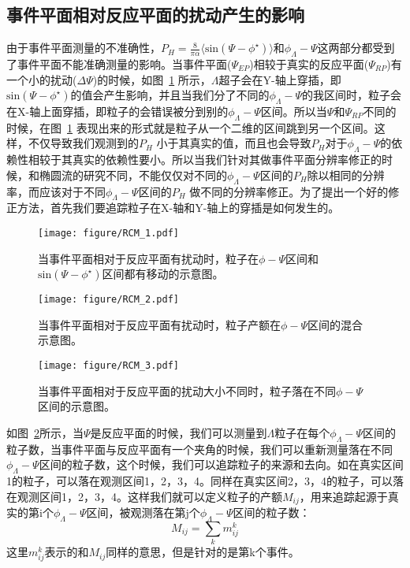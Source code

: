 \subsection{事件平面相对反应平面的扰动产生的影响}
由于事件平面测量的不准确性，$P_{H} = \frac{8}{\pi\alpha} \langle \mathrm{sin}(\Psi-\phi^{\star}) \rangle $和$\phi_{\Lambda}-\Psi$这两部分都受到了事件平面不能准确测量的影响。当事件平面($\Psi_{EP}$)相较于真实的反应平面($\Psi_{RP}$)有一个小的扰动($\Delta\Psi$)的时候，如图~\ref{fig:RCM_1} 所示，$\Lambda$超子会在Y-轴上穿插，即$\mathrm{sin}(\Psi-\phi^{\star})$的值会产生影响，并且当我们分了不同的$\phi_{\Lambda}-\Psi$的我区间时，粒子会在X-轴上面穿插，即粒子的会错误被分到别的$\phi_{\Lambda}-\Psi$区间。所以当$\Psi$和$\Psi_{RP}$不同的时候，在图~\ref{fig:RCM_1} 表现出来的形式就是粒子从一个二维的区间跳到另一个区间。这样，不仅导致我们观测到的$P_{H}$ 小于其真实的值，而且也会导致$P_{H}$对于$\phi_{\Lambda}-\Psi$的依赖性相较于其真实的依赖性要小。所以当我们针对其做事件平面分辨率修正的时候，和椭圆流的研究不同，不能仅仅对不同的$\phi_{\Lambda}-\Psi$区间的$P_{H}$除以相同的分辨率，而应该对于不同$\phi_{\Lambda}-\Psi$区间的$P_{H}$ 做不同的分辨率修正。为了提出一个好的修正方法，首先我们要追踪粒子在X-轴和Y-轴上的穿插是如何发生的。
\begin{figure}[htbp]
\centering
\texttt{[image: figure/RCM\_1.pdf]}
\caption{当事件平面相对于反应平面有扰动时，粒子在$\phi-\Psi$区间和$\mathrm{sin}(\Psi-\phi^{\star})$区间都有移动的示意图。}
\label{fig:RCM_1}
\end{figure}

\begin{figure}[htbp]
\centering
\texttt{[image: figure/RCM\_2.pdf]}
\caption{当事件平面相对于反应平面有扰动时，粒子产额在$\phi-\Psi$区间的混合示意图。}
\label{fig:RCM_2}
\end{figure}

\begin{figure}[htbp]
\centering
\texttt{[image: figure/RCM\_3.pdf]}
\caption{当事件平面相对于反应平面的扰动大小不同时，粒子落在不同$\phi-\Psi$区间的示意图。}
\label{fig:RCM_3}
\end{figure}

如图~\ref{fig:RCM_2}所示，当$\Psi$是反应平面的时候，我们可以测量到$\Lambda$粒子在每个$\phi_{\Lambda}-\Psi$区间的粒子数，当事件平面与反应平面有一个夹角的时候，我们可以重新测量落在不同$\phi_{\Lambda}-\Psi$区间的粒子数，这个时候，我们可以追踪粒子的来源和去向。如在真实区间1的粒子，可以落在观测区间1，2，3，4。同样在真实区间2，3，4的粒子，可以落在观测区间1，2，3，4。这样我们就可以定义粒子的产额$M_{ij}$，用来追踪起源于真实的第i个$\phi_{\Lambda}-\Psi$区间，被观测落在第j个$\phi_{\Lambda}-\Psi$区间的粒子数：
\begin{equation}
\label{eq:M_ij}
M_{ij} = \sum_{k} m^{k}_{ij}
\end{equation}
这里$m^{k}_{ij}$表示的和$M_{ij}$同样的意思，但是针对的是第k个事件。

